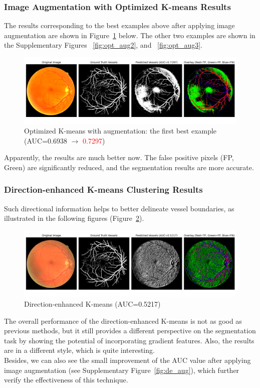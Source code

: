 \documentclass[final]{article}
\begin{document}
\subsubsection{Image Augmentation with Optimized K-means Results}
The results corresponding to the best examples above after applying image augmentation are shown in Figure~\ref{fig:opt_aug1} below. The other two examples are shown in the Supplementary Figures ~\ref{fig:opt_aug2}, and ~\ref{fig:opt_aug3}.
\begin{figure}[H]
    \centering
    \includegraphics[scale=0.25]{Figures/4 Optimized 1st.png}
    \vspace{-0.25cm}
    \caption{Optimized K-means with augmentation: the first best example (AUC=0.6938 $\rightarrow$ \textcolor{red}{0.7297})}
    \label{fig:opt_aug1}
\end{figure}
Apparently, the results are much better now. The false positive pixels (FP, Green) are significantly reduced, and the segmentation results are more accurate. 
\subsubsection{Direction-enhanced K-means Clustering Results}
Such directional information helps to better delineate vessel boundaries, as illustrated in the following figures (Figure~\ref{fig:de}).
\begin{figure}[H]
    \centering
    \includegraphics[scale=0.25]{Figures/5 Directed (Merge 3 Clusters).png}
    \vspace{-0.25cm}
    \caption{Direction-enhanced K-means (AUC=0.5217)}
    \label{fig:de}
\end{figure}
The overall performance of the direction-enhanced K-means is not as good as previous methods, but it still provides a different perspective on the segmentation task by showing the potential of incorporating gradient features. Also, the results are in a different style, which is quite interesting. \\
Besides, we can also see the small improvement of the AUC value after applying image augmentation (see Supplementary Figure~\ref{fig:de_aug}), which further verify the effectiveness of this technique. 
\end{document}
